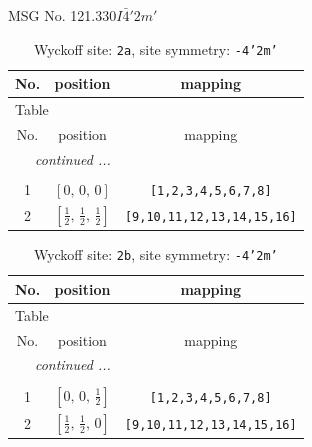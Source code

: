 \documentclass[fleqn,8pt]{jsarticle}
\begin{document}
\setcounter{MaxMatrixCols}{32}

\renewcommand{\tablename}{Table~}
\renewcommand{\figurename}{Figure~}
\begin{center}
\LARGE
MSG No. 121.330\quad$I\bar{4}'2m'$
\end{center}
\renewcommand{\arraystretch}{1.2}
\begin{longtable}{ccc}
\caption{Wyckoff site: {\tt 2a}, site symmetry: {\tt -4'2m'}}
 \\
 \hline \hline
No. & position & mapping \\ \hline \endfirsthead

\multicolumn{2}{l}{\tablename\ \thetable{}} \\
 \hline \hline
No. & position & mapping \\ \hline \endhead

 \hline \hline
\multicolumn{2}{r}{\footnotesize\it continued ...} \\ \endfoot

 \hline \hline
\multicolumn{2}{r}{} \\ \endlastfoot

1 & $\left[ 0,\, 0,\, 0 \right]$ & {\tt [1,2,3,4,5,6,7,8]} \\ \hline
2 & $\left[ \frac{1}{2},\, \frac{1}{2},\, \frac{1}{2} \right]$ & {\tt [9,10,11,12,13,14,15,16]} \\
\end{longtable}
\renewcommand{\arraystretch}{1.2}
\begin{longtable}{ccc}
\caption{Wyckoff site: {\tt 2b}, site symmetry: {\tt -4'2m'}}
 \\
 \hline \hline
No. & position & mapping \\ \hline \endfirsthead

\multicolumn{2}{l}{\tablename\ \thetable{}} \\
 \hline \hline
No. & position & mapping \\ \hline \endhead

 \hline \hline
\multicolumn{2}{r}{\footnotesize\it continued ...} \\ \endfoot

 \hline \hline
\multicolumn{2}{r}{} \\ \endlastfoot

1 & $\left[ 0,\, 0,\, \frac{1}{2} \right]$ & {\tt [1,2,3,4,5,6,7,8]} \\ \hline
2 & $\left[ \frac{1}{2},\, \frac{1}{2},\, 0 \right]$ & {\tt [9,10,11,12,13,14,15,16]} \\
\end{longtable}
\end{document}
